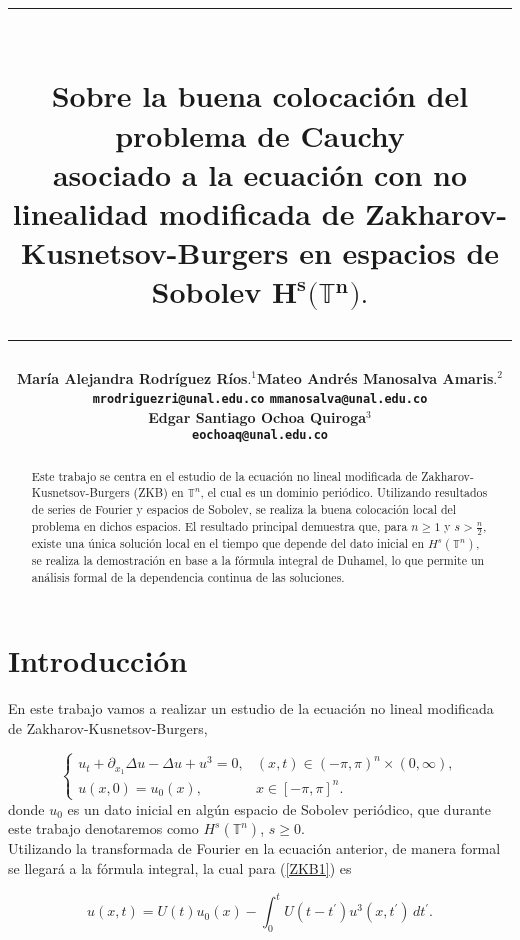 \documentclass[12pt]{article}
\title{\vspace{-2cm}\par\noindent\rule{16cm}{1pt}\large
\\\bfseries Sobre la buena colocación del problema de Cauchy \\
asociado a la ecuación con no linealidad modificada de Zakharov-Kusnetsov-Burgers en espacios de Sobolev $\mathbf{H^s}\pmb{(}\pmb{\mathbb{T}}\mathbf{^n}\pmb{)}.$
\vspace{-0.34cm}\par\noindent\hspace{0.15cm}\rule{16cm}{1pt}
\vspace{-0.6cm}
}
\author{\small \bfseries María Alejandra Rodríguez Ríos$.^1$\quad \quad\small Mateo Andrés Manosalva Amaris$.^{2}$\\ \small \quad \texttt{mrodriguezri@unal.edu.co} \quad \quad \quad \quad \quad \quad \texttt{mmanosalva@unal.edu.co}\quad\quad \quad\\ \small \bfseries Edgar Santiago Ochoa Quiroga$^{3}$\\
\small \texttt{eochoaq@unal.edu.co}
}
\newcommand\T{\mathbb{T}}
\begin{document}
\maketitle
\begin{abstract}
Este trabajo se centra en el estudio de la ecuación no lineal modificada de Zakharov-Kusnetsov-Burgers (ZKB) en $\T^n$, el cual es un dominio periódico. Utilizando resultados de series de Fourier y espacios de Sobolev, se realiza la buena colocación local del problema en dichos espacios. El resultado principal demuestra que, para $n \geq 1$ y $s > \frac{n}{2}$, existe una única solución local en el tiempo que depende del dato inicial en $H^s(\mathbb{T}^n)$, se realiza la demostración en base a la fórmula integral de Duhamel, lo que permite un análisis formal de la dependencia continua de las soluciones.
\end{abstract}

\section{Introducción}
En este trabajo vamos a realizar un estudio de la ecuación no lineal modificada de Zakharov-Kusnetsov-Burgers,

\begin{equation}\label{ZKB1}
    \begin{cases}
    u_t+\partial_{x_1}\Delta u-\Delta u+u^3=0, & (x,t)\in(-\pi,\pi)^n\times(0,\infty),\\
    u(x,0)=u_0(x), & x\in[-\pi,\pi]^n.
\end{cases}
\end{equation}
donde $u_0$ es un dato inicial en algún espacio de Sobolev periódico, que durante este trabajo denotaremos como $H^s(\mathbb{T}^n)$, $s \geq 0$. \\

Utilizando la transformada de Fourier en la ecuación anterior, de manera formal  se llegará a la fórmula integral, la cual para (\ref{ZKB1}) es 

\begin{equation*}\label{Duhamel}
u(x,t)=U(t)u_0(x)-\int_0^tU(t-t^\prime)u^3(x,t^\prime)\,dt^\prime.
\end{equation*}
      
\end{document}
